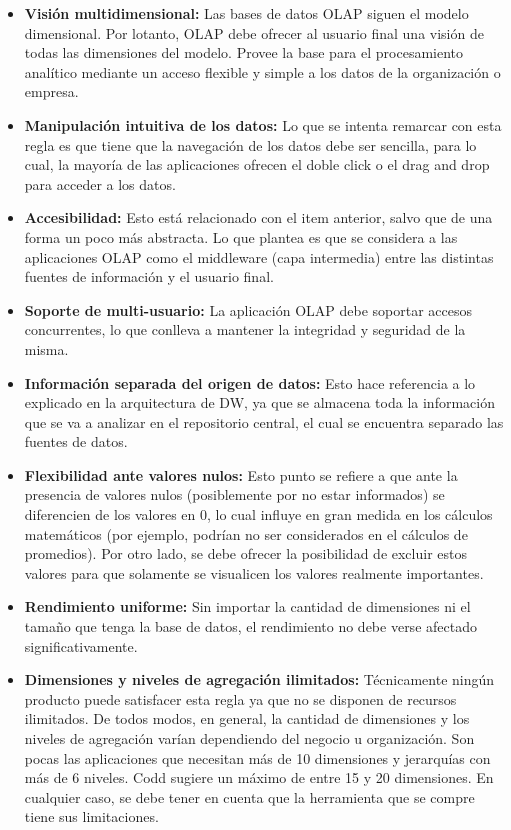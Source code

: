 \documentclass[a4paper,11pt]{article}
\begin{document}
    \begin{itemize}
      \item \textbf{Visión multidimensional:} Las bases de datos OLAP siguen el modelo dimensional. Por lotanto, OLAP debe ofrecer al usuario final
      una visión de todas las dimensiones del modelo. Provee la base para el procesamiento analítico mediante un acceso flexible y simple a los datos de la 
      organización o empresa.
      \item \textbf{Manipulación intuitiva de los datos:} Lo que se intenta remarcar con esta regla es que tiene que la navegación de los datos debe ser
      sencilla, para lo cual, la mayoría de las aplicaciones ofrecen el doble click o el drag and drop para acceder a los datos.
      \item \textbf{Accesibilidad:} Esto está relacionado con el item anterior, salvo que de una forma un poco más abstracta. Lo que plantea es que se
      considera a las aplicaciones OLAP como el middleware (capa intermedia) entre las distintas fuentes de información y el usuario final.
      \item \textbf{Soporte de multi-usuario:} La aplicación OLAP debe soportar accesos concurrentes, lo que conlleva a mantener la integridad y seguridad
      de la misma.
      \item \textbf{Información separada del origen de datos:} Esto hace referencia a lo explicado en la arquitectura de DW, ya que se almacena toda la
      información que se va a analizar en el repositorio central, el cual se encuentra separado las fuentes de datos.
      \item \textbf{Flexibilidad ante valores nulos:} Esto punto se refiere a que ante la presencia de valores nulos (posiblemente por no estar informados)
      se diferencien de los valores en 0, lo cual influye en gran medida en los cálculos matemáticos (por ejemplo, podrían no ser considerados en el cálculos
      de promedios). Por otro lado, se debe ofrecer la posibilidad de excluir estos valores para que solamente se visualicen los valores realmente
      importantes.
      \item \textbf{Rendimiento uniforme:} Sin importar la cantidad de dimensiones ni el tamaño que tenga la base de datos, el rendimiento no debe verse
      afectado significativamente.
      \item \textbf{Dimensiones y niveles de agregación ilimitados:} Técnicamente ningún producto puede satisfacer esta regla ya que no se disponen de
      recursos ilimitados. De todos modos, en general, la cantidad de dimensiones y los niveles de agregación varían dependiendo del negocio u organización.
      Son pocas las aplicaciones que necesitan más de 10 dimensiones y jerarquías con más de 6 niveles. Codd sugiere un máximo de entre 15 y 20 dimensiones.
      En cualquier caso, se debe tener en cuenta que la herramienta que se compre tiene sus limitaciones.
    \end{itemize}
    
\end{document}
